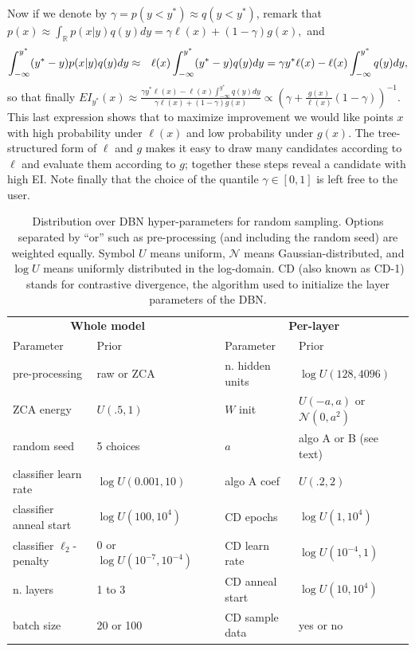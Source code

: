 \documentclass{article}
\newcommand{\algorandom}{random}
\newcommand{\vs}[1]{\vspace*{-#1mm}}
\begin{document}
Now if we denote by $\gamma = p(y<y^*)\approx q(y<y^*)$, remark that 
$
p(x) \approx \int_\mathbb{R} p(x\vert y) q(y) dy = \gamma \ell(x) +
(1-\gamma) g(x),
$
and
\begin{eqnarray}
\vs{.5}
\int_{-\infty}^{y^*} (y^* - y) p(x|y)q(y) dy &\approx&
\ell(x)\int_{-\infty}^{y^*} (y^* - y) q(y) dy\nonumber= \gamma y^*\ell(x) - \ell(x)\int_{-\infty}^{y^*} q(y)dy,
\vs{.5}
\end{eqnarray}
so that finally
$
EI_{y^*}(x) \approx \frac{\gamma y^*\ell(x) - \ell(x)\int_{-\infty}^{y^*} q(y)dy}{\gamma \ell(x) +
(1-\gamma) g(x)}
\propto \left( \gamma + \frac{g(x)}{\ell(x)}(1-\gamma)\right)^{-1}.
$
This last expression shows that to maximize improvement we would like
points $x$ with high probability under $\ell(x)$ and low probability
under $g(x)$. The tree-structured form of $\ell$ and $g$ makes it easy to draw many candidates according to $\ell$ and evaluate them according to $g$;
together these steps reveal a candidate with high EI. Note finally
that the choice of the quantile $\gamma\in[0,1]$ is left free to the user.

\begin{table}
\vs{4}
    \caption{Distribution over DBN hyper-parameters for random sampling.
    Options separated by ``or''  such as pre-processing (and including the random seed) are weighted equally.
    Symbol $U$ means uniform, $\mathcal{N}$ means Gaussian-distributed, and $\log U$ means uniformly distributed in the log-domain.
    CD (also known as CD-1) stands for contrastive divergence, the algorithm used to initialize the layer parameters of the DBN.
    }
    \label{tbl:dbnprior}
    \centering
    \begin{tabular}{llp{.1in}ll}
        \multicolumn{2}{c}{{\bf Whole model}} & & \multicolumn{2}{c}{\bf Per-layer} \\
        Parameter & Prior & & Parameter & Prior \\
        \hline
        pre-processing & raw or ZCA & & n. hidden units & $\log U(128, 4096)$\\
        ZCA energy & $U(.5, 1)$ & & $W$ init & $U(-a,a)$ or $\mathcal{N}(0, a^2)$ \\
        random seed & 5 choices & & $a$ & algo A or B (see text)\\
        classifier learn rate & $\log U(0.001, 10)$ & & algo A coef& $U(.2,2)$\\
        classifier anneal start & $\log U(100, 10^4)$ & & CD epochs & $\log U(1, 10^4)$\\
        classifier $\ell_2$-penalty & 0 or $\log U(10^{-7}, 10^{-4})$ & & CD learn rate & $\log U(10^{-4},1)$ \\
        n. layers & 1 to 3 & & CD anneal start & $\log U(10, 10^4)$ \\
        batch size & 20 or 100 & & CD sample data & yes or no \\
        \hline
    \end{tabular}
\vs{4}
\end{table}
\end{document}
